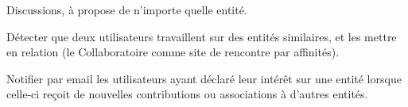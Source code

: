 \startchapter[title={Instruments sociaux}]

\startTODO
\startitemize
	\item Discussions, à propose de n'importe quelle entité.
	\item Détecter que deux utilisateurs travaillent sur des entités similaires, et les mettre en relation (le Collaboratoire comme site de rencontre par affinités).
	\item Notifier par email les utilisateurs ayant déclaré leur intérêt sur une entité lorsque celle-ci reçoit de nouvelles contributions ou associations à d'autres entités.
\stopitemize
\stopTODO